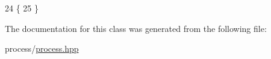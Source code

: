 \begin{DoxyCode}
24                \{
25     \}
\end{DoxyCode}


The documentation for this class was generated from the following file\-:\begin{DoxyCompactItemize}
\item 
process/\hyperlink{process_8hpp}{process.\-hpp}\end{DoxyCompactItemize}
